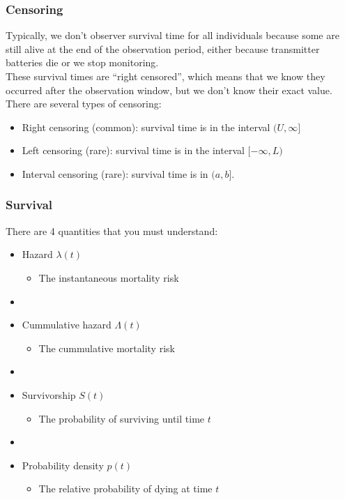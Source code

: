 \documentclass[color=usenames,dvipsnames]{beamer}\usepackage[]{graphicx}\usepackage[]{xcolor}
\begin{document}
\begin{frame}
  \frametitle{Censoring}
  Typically, we don't observer survival time for all individuals
  because some are still alive at the end of the observation period,
  either because transmitter batteries die or we stop monitoring. \\
  \pause
  \vfill
  These survival times are ``right censored'', which means that we
  know they occurred after the observation window, but we don't know
  their exact value. \\
  \pause
  \vfill
  There are several types of censoring: 
  \begin{itemize}%
    \small
    \item Right censoring (common): survival time is in the interval $(U,\infty]$
    \item Left censoring (rare): survival time is in the interval
      $[-\infty,L)$
    \item Interval censoring (rare): survival time is in $(a,b]$. 
  \end{itemize}  
\end{frame}





\begin{frame}
  \frametitle{Survival}
  \large
  There are 4 quantities that you must understand:
  \vfill
  \begin{itemize}%
    \item<1-> Hazard $\lambda(t)$
      \begin{itemize}
        \item The instantaneous mortality risk
      \end{itemize}
    \item[]
    \item<2-> Cummulative hazard $\Lambda(t)$
      \begin{itemize}
        \item The cummulative mortality risk
      \end{itemize}
    \item[]
    \item<3-> Survivorship $S(t)$
      \begin{itemize}
        \item The probability of surviving until time $t$
      \end{itemize}
    \item[]
    \item<4-> Probability density $p(t)$
      \begin{itemize}
        \item The relative probability of dying at time $t$
      \end{itemize}
  \end{itemize}
\end{frame}
\end{document}
